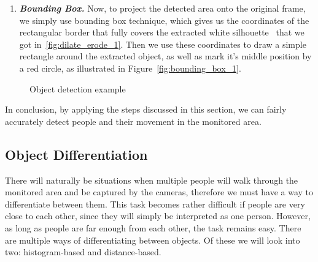 \begin{enumerate}
	\item \textit{\textbf{Bounding Box.}} Now, to project the detected area onto the original frame, we simply use bounding box technique, which gives us the coordinates of the rectangular border that fully covers the extracted white silhouette~\cite{bounding_box_1} that we got in~\ref{fig:dilate_erode_1}. Then we use these coordinates to draw a simple rectangle around the extracted object, as well as mark it's middle position by a red circle, as illustrated in Figure~\ref{fig:bounding_box_1}.
	\end{enumerate}
	\begin{figure}[htb]
		\centering
		\quad
		\quad
		\quad
		\caption{Object detection example}
		\label{fig:object_detection_example}
	\end{figure}
	
	In conclusion, by applying the steps discussed in this section, we can fairly accurately detect people and their movement in the monitored area.
	
\subsection{Object Differentiation}
\label{object_differentiation}
There will naturally be situations when multiple people will walk through the monitored area and be captured by the cameras, therefore we must have a way to differentiate between them. This task becomes rather difficult if people are very close to each other, since they will simply be interpreted as one person. However, as long as people are far enough from each other, the task remains easy. There are multiple ways of differentiating between objects. Of these we will look into two: histogram-based and distance-based.

